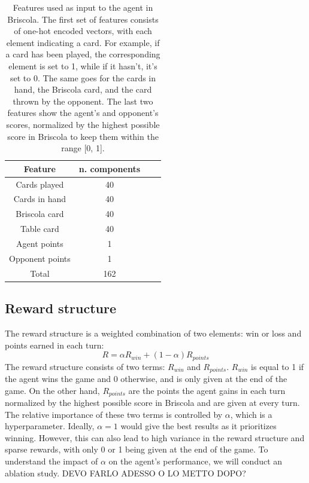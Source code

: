 \begin{table}[H]
    \centering
    \begin{tabular}{c c c c} 
     \hline
     Feature & n. components \\
     \hline
        Cards played & 40 \\
        Cards in hand & 40 \\
        Briscola card & 40 \\
        Table card & 40 \\
        \hline
        Agent points & 1 \\
        Opponent points & 1 \\
        \hline
        Total & 162 \\
        \hline
    \end{tabular}

    \caption{Features used as input to the agent in Briscola. The first set of features consists of one-hot encoded vectors, with each element indicating a card. For example, if a card has been played, the corresponding element is set to 1, while if it hasn't, it's set to 0. The same goes for the cards in hand, the Briscola card, and the card thrown by the opponent. The last two features show the agent's and opponent's scores, normalized by the highest possible score in Briscola to keep them within the range [0, 1].}
    \label{tab:state}
\end{table}

\subsection{Reward structure}
The reward structure is a weighted combination of two elements: win or loss and points earned in each turn:
\begin{equation}
    R = \alpha R_{win} + (1 - \alpha) R_{points}
    \label{eq:reward-structure}
\end{equation}
The reward structure consists of two terms: $R_{win}$ and $R_{points}$. $R_{win}$ is equal to 1 if the agent wins the game and 0 otherwise, and is only given at the end of the game. On the other hand, $R_{points}$ are the points the agent gains in each turn normalized by the highest possible score in Briscola and are given at every turn. The relative importance of these two terms is controlled by $\alpha$, which is a hyperparameter. Ideally, $\alpha=1$ would give the best results as it prioritizes winning. However, this can also lead to high variance in the reward structure and sparse rewards, with only 0 or 1 being given at the end of the game. To understand the impact of $\alpha$ on the agent's performance, we will conduct an ablation study. DEVO FARLO ADESSO O LO METTO DOPO?

